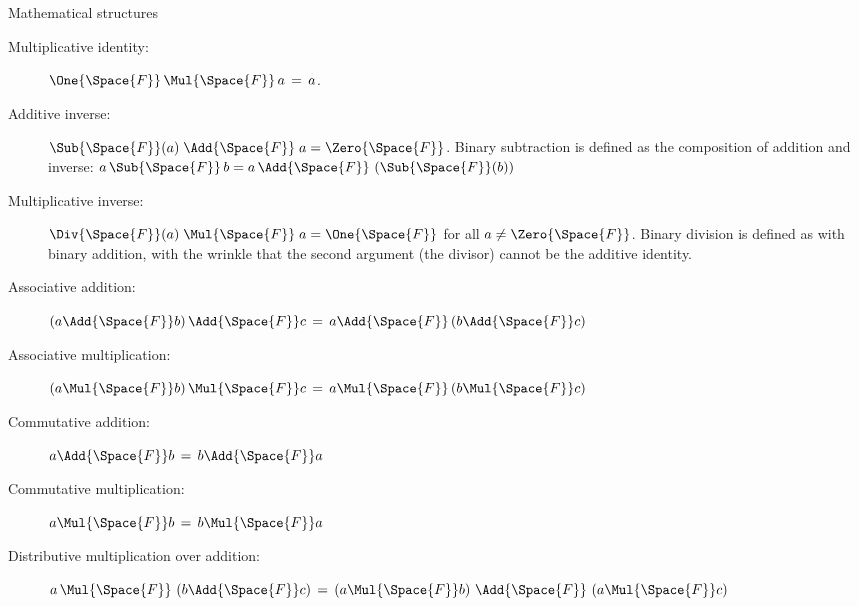 \documentclass[12pt]{PalisadesLakesBook}
\begin{document}
\begin{plSection}{Mathematical structures}
\begin{description}
\item[Multiplicative identity:] 
$\One{\Space{F}} \,\Mul{\Space{F}}\, a \,=\, a$.

\item[Additive inverse:] 
$\Sub{\Space{F}}(a) \;\Add{\Space{F}}\; a = \Zero{\Space{F}}$.
Binary subtraction is defined as the composition 
of addition and inverse:
$a \,\Sub{\Space{F}}\, b = 
a \,\Add{\Space{F}}\, \left(\Sub{\Space{F}}(b)\right) $

\item[Multiplicative inverse:] 
$\Div{\Space{F}}(a) \;\Mul{\Space{F}}\; a = \One{\Space{F}}$ 
for all $a \neq \Zero{\Space{F}}$.
Binary division is defined as with binary addition,
with the wrinkle that the second argument (the divisor)
cannot be the additive identity.

\item[Associative addition:] 
$\left( a \Add{\Space{F}} b \right)  \Add{\Space{F}} c 
\,=\, 
a  \Add{\Space{F}} \left( b  \Add{\Space{F}} c \right)$

\item[Associative multiplication:] 
$\left( a  \Mul{\Space{F}} b \right) \Mul{\Space{F}} c 
\,=\, 
a \Mul{\Space{F}} \left( b \Mul{\Space{F}} c \right)$

\item[Commutative addition:] 
$a \Add{\Space{F}} b \,=\, b \Add{\Space{F}} a$

\item[Commutative multiplication:] 
$a \Mul{\Space{F}} b \,=\, b \Mul{\Space{F}} a$

\item[Distributive multiplication over addition:] 
$a \, \Mul{\Space{F}} \, \left( b \Add{\Space{F}} c \right)
\,=\, 
\left(a \Mul{\Space{F}} b \right) 
\, \Add{\Space{F}} \, 
\left(a \Mul{\Space{F}} c \right)$

\end{description}

\end{plSection}%
\end{document}
